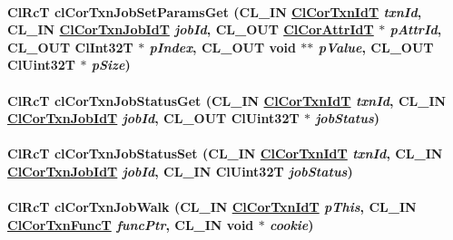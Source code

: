 \hypertarget{group__group13_ga73}{
\paragraph[clCorTxnJobSetParamsGet]{\setlength{\rightskip}{0pt plus 5cm}Cl\-Rc\-T cl\-Cor\-Txn\-Job\-Set\-Params\-Get (CL\_\-IN \hyperlink{group__group13_ga17}{Cl\-Cor\-Txn\-Id\-T} {\em txn\-Id}, CL\_\-IN \hyperlink{group__group13_ga18}{Cl\-Cor\-Txn\-Job\-Id\-T} {\em job\-Id}, CL\_\-OUT \hyperlink{group__group13_ga3}{Cl\-Cor\-Attr\-Id\-T} $\ast$ {\em p\-Attr\-Id}, CL\_\-OUT Cl\-Int32T $\ast$ {\em p\-Index}, CL\_\-OUT void $\ast$$\ast$ {\em p\-Value}, CL\_\-OUT Cl\-Uint32T $\ast$ {\em p\-Size})}\hfill}
\label{group__group13_ga73}


\hypertarget{group__group13_ga84}{
\paragraph[clCorTxnJobStatusGet]{\setlength{\rightskip}{0pt plus 5cm}Cl\-Rc\-T cl\-Cor\-Txn\-Job\-Status\-Get (CL\_\-IN \hyperlink{group__group13_ga17}{Cl\-Cor\-Txn\-Id\-T} {\em txn\-Id}, CL\_\-IN \hyperlink{group__group13_ga18}{Cl\-Cor\-Txn\-Job\-Id\-T} {\em job\-Id}, CL\_\-OUT Cl\-Uint32T $\ast$ {\em job\-Status})}\hfill}
\label{group__group13_ga84}


\hypertarget{group__group13_ga83}{
\paragraph[clCorTxnJobStatusSet]{\setlength{\rightskip}{0pt plus 5cm}Cl\-Rc\-T cl\-Cor\-Txn\-Job\-Status\-Set (CL\_\-IN \hyperlink{group__group13_ga17}{Cl\-Cor\-Txn\-Id\-T} {\em txn\-Id}, CL\_\-IN \hyperlink{group__group13_ga18}{Cl\-Cor\-Txn\-Job\-Id\-T} {\em job\-Id}, CL\_\-IN Cl\-Uint32T {\em job\-Status})}\hfill}
\label{group__group13_ga83}


\hypertarget{group__group13_ga66}{
\paragraph[clCorTxnJobWalk]{\setlength{\rightskip}{0pt plus 5cm}Cl\-Rc\-T cl\-Cor\-Txn\-Job\-Walk (CL\_\-IN \hyperlink{group__group13_ga17}{Cl\-Cor\-Txn\-Id\-T} {\em p\-This}, CL\_\-IN \hyperlink{group__group13_ga60}{Cl\-Cor\-Txn\-Func\-T} {\em func\-Ptr}, CL\_\-IN void $\ast$ {\em cookie})}\hfill}
\label{group__group13_ga66}


